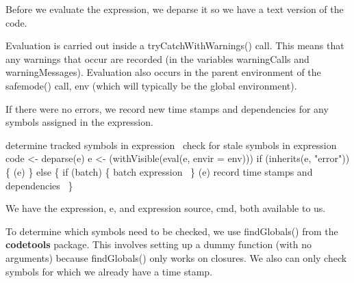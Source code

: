 \documentclass[a4paper]{article}%
\newcommand{\pkg}[1]{{\bf #1}}
\begin{document}
Before we evaluate the expression, we deparse it so we have a text
version of the code.

Evaluation is carried out inside a {\Tt{}tryCatchWithWarnings()\nwendquote} call.
This means that any warnings that occur are recorded (in the variables
{\Tt{}warningCalls\nwendquote} and {\Tt{}warningMessages\nwendquote}).  Evaluation also occurs
in the parent environment of the {\Tt{}safemode()\nwendquote} call, {\Tt{}env\nwendquote} (which will
typically be the global environment).  

If there were no errors, we record new time stamps and dependencies
for any symbols assigned in the expression.

\nwenddocs{}\endmoddef\nwstartdeflinemarkup{}\nwenddeflinemarkup
\LA{}determine tracked symbols in expression~{\nwtagstyle{}}\RA{}
\LA{}check for stale symbols in expression~{\nwtagstyle{}}\RA{}
code <- deparse(e)                                 
e <- (withVisible(eval(e,
                                           envir = env)))
if (inherits(e, "error")) \{
    (e)
\} else \{
    if (batch) \{
        \LA{}batch expression~{\nwtagstyle{}}\RA{}
    \}
    (e)
    \LA{}record time stamps and dependencies~{\nwtagstyle{}}\RA{}
\}
\nwendcode{}\nwdocspar

We have the expression, {\Tt{}e\nwendquote}, and expression source, {\Tt{}cmd\nwendquote},
both available to us.

To determine which symbols need to be checked, we use 
{\Tt{}findGlobals()\nwendquote} from the \pkg{codetools} package.
This involves setting up a dummy function (with no arguments)
because {\Tt{}findGlobals()\nwendquote}
only works on closures.  We also can only check symbols for which
we already have a time stamp.
\end{document}
